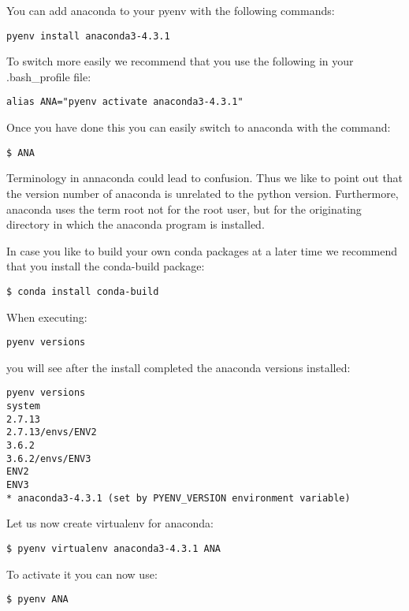You can add anaconda to your pyenv with the following commands:

\begin{verbatim}
pyenv install anaconda3-4.3.1
\end{verbatim}

To switch more easily we recommend that you use the following in your
.bash\_profile file:

\begin{verbatim}
alias ANA="pyenv activate anaconda3-4.3.1"
\end{verbatim}

Once you have done this you can easily switch to anaconda with the
command:

\begin{verbatim}
$ ANA
\end{verbatim}

Terminology in annaconda could lead to confusion. Thus we like to point
out that the version number of anaconda is unrelated to the python
version. Furthermore, anaconda uses the term root not for the root user,
but for the originating directory in which the anaconda program is
installed.

In case you like to build your own conda packages at a later time we
recommend that you install the conda-build package:

\begin{verbatim}
$ conda install conda-build
\end{verbatim}

When executing:

\begin{verbatim}
pyenv versions
\end{verbatim}

you will see after the install completed the anaconda versions
installed:

\begin{verbatim}
pyenv versions
system
2.7.13
2.7.13/envs/ENV2
3.6.2
3.6.2/envs/ENV3
ENV2 
ENV3
* anaconda3-4.3.1 (set by PYENV_VERSION environment variable)
\end{verbatim}

Let us now create virtualenv for anaconda:

\begin{verbatim}
$ pyenv virtualenv anaconda3-4.3.1 ANA
\end{verbatim}

To activate it you can now use:

\begin{verbatim}
$ pyenv ANA
\end{verbatim}

